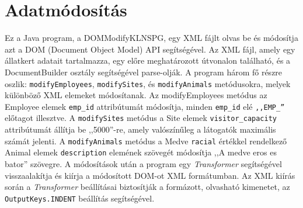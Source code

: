 \documentclass[12pt]{report}
\begin{document}
\section{Adatmódosítás}
\indent\indent Ez a Java program, a DOMModifyKLNSPG, egy XML fájlt olvas be és módosítja azt a DOM (Document Object Model) API segítségével. Az XML fájl, amely egy állatkert adatait tartalmazza, egy előre meghatározott útvonalon található, és a DocumentBuilder osztály segítségével parse-olják. A program három fő részre oszlik: \texttt{modifyEmployees}, \texttt{modifySites}, és \texttt{modifyAnimals} metódusokra, melyek különböző XML elemeket módosítanak. Az modifyEmployees metódus az Employee elemek \texttt{emp\_id} attribútumát módosítja, minden \texttt{emp\_id} elé \texttt{,,EMP\_''} előtagot illesztve. A \texttt{modifySites} metódus a Site elemek \texttt{visitor\_capacity} attribútumát állítja be ,,5000''-re, amely valószínűleg a látogatók maximális számát jelenti. A \texttt{modifyAnimals} metódus a Medve \texttt{racial} értékkel rendelkező Animal elemek \texttt{description} elemének szövegét módosítja ,,A medve eros es bator'' szövegre. A módosítások után a program egy \textit{Transformer} segítségével visszaalakítja és kiírja a módosított DOM-ot XML formátumban. Az XML kiírás során a \textit{Transformer} beállításai biztosítják a formázott, olvasható kimenetet, az \texttt{OutputKeys.INDENT} beállítás segítségével.\\
\end{document}

